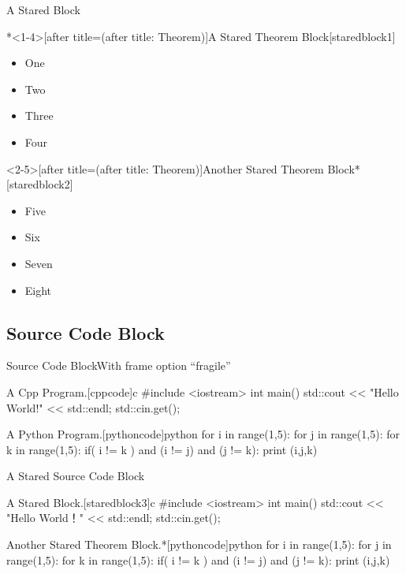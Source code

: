 \documentclass[hyperref, UTF8, CJK]{beamer}
\begin{document}
\begin{frame}{A Stared Block}
\begin{scutheorem}*<1-4>[after title=(after title: Theorem)]{A Stared Theorem Block}[staredblock1]
	\begin{itemize}[<+->]
		\item One
		\item Two~\only<2>{Two}
		\item \alert<3>{Three}
		\item Four
	\end{itemize}
\end{scutheorem}
\begin{scutheorem}<2-5>[after title=(after title: Theorem)]{Another Stared Theorem Block}*[staredblock2]
	\begin{itemize}
		\item Five
		\item Six~\only<3>{Six}
		\item \alert<3>{Seven}
		\item Eight
	\end{itemize}
\end{scutheorem}
\end{frame}

\subsection{Source Code Block}
\begin{frame}[fragile]{Source Code Block}{With frame option ``fragile''}
	\onslide<2>
	\begin{scucode}{A Cpp Program.}[cppcode]{c}
		#include <iostream>
		int main()
		{
			std::cout << "Hello World!" << std::endl;
			std::cin.get();
		}
	\end{scucode}
	\begin{scucode}{A Python Program.}[pythoncode]{python}
		for i in range(1,5):
			for j in range(1,5):
				for k in range(1,5):
					if( i != k ) and (i != j) and (j != k):
						print (i,j,k)
	\end{scucode}
\end{frame}

\begin{frame}[fragile]{A Stared Source Code Block}
	\begin{scucode*}{A Stared Block.}[staredblock3]{c}
		#include <iostream>
		int main()
		{
			std::cout << "Hello World！" << std::endl;
			std::cin.get();
		}
	\end{scucode*}
	\begin{scucode}{Another Stared Theorem Block.}*[pythoncode]{python}
		for i in range(1,5):
			for j in range(1,5):
				for k in range(1,5):
					if( i != k ) and (i != j) and (j != k):
						print (i,j,k)
	\end{scucode}
\end{frame}
\end{document}

